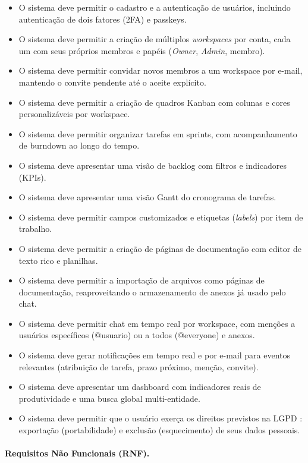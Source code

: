 \documentclass[12pt]{article}
\begin{document}
\begin{itemize}
  \item[RF01] O sistema deve permitir o cadastro e a autenticação de usuários, incluindo autenticação de dois fatores (2FA) e passkeys.
  \item[RF02] O sistema deve permitir a criação de múltiplos \emph{workspaces} por conta, cada um com seus próprios membros e papéis (\emph{Owner}, \emph{Admin}, membro).
  \item[RF03] O sistema deve permitir convidar novos membros a um workspace por e-mail, mantendo o convite pendente até o aceite explícito.
  \item[RF04] O sistema deve permitir a criação de quadros Kanban com colunas e cores personalizáveis por workspace.
  \item[RF05] O sistema deve permitir organizar tarefas em sprints, com acompanhamento de burndown ao longo do tempo.
  \item[RF06] O sistema deve apresentar uma visão de backlog com filtros e indicadores (KPIs).
  \item[RF07] O sistema deve apresentar uma visão Gantt do cronograma de tarefas.
  \item[RF08] O sistema deve permitir campos customizados e etiquetas (\emph{labels}) por item de trabalho.
  \item[RF09] O sistema deve permitir a criação de páginas de documentação com editor de texto rico e planilhas.
  \item[RF10] O sistema deve permitir a importação de arquivos como páginas de documentação, reaproveitando o armazenamento de anexos já usado pelo chat.
  \item[RF11] O sistema deve permitir chat em tempo real por workspace, com menções a usuários específicos (@usuario) ou a todos (@everyone) e anexos.
  \item[RF12] O sistema deve gerar notificações em tempo real e por e-mail para eventos relevantes (atribuição de tarefa, prazo próximo, menção, convite).
  \item[RF13] O sistema deve apresentar um dashboard com indicadores reais de produtividade e uma busca global multi-entidade.
  \item[RF14] O sistema deve permitir que o usuário exerça os direitos previstos na LGPD \cite{lgpd}: exportação (portabilidade) e exclusão (esquecimento) de seus dados pessoais.
\end{itemize}

\paragraph{Requisitos Não Funcionais (RNF).}
\end{document}
